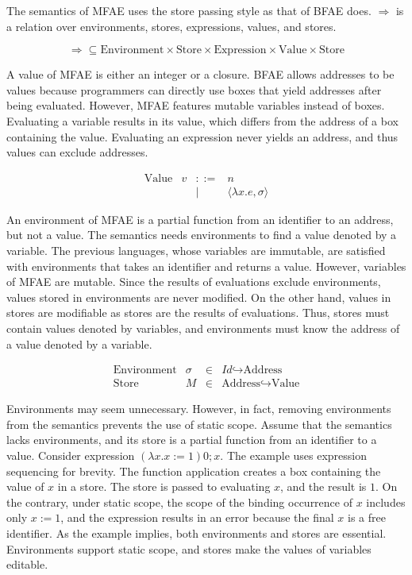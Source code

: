 The semantics of MFAE uses the store passing style as that of BFAE does. \(\Rightarrow\) is a relation over environments, stores, expressions, values, and stores.

\[\Rightarrow\subseteq\text{Environment}\times\text{Store}\times\text{Expression}\times\text{Value}\times\text{Store}\]

A value of MFAE is either an integer or a closure. BFAE allows addresses to be values because programmers can directly use boxes that yield addresses after being evaluated. However, MFAE features mutable variables instead of boxes. Evaluating a variable results in its value, which differs from the address of a box containing the value. Evaluating an expression never yields an address, and thus values can exclude addresses.

\[
\begin{array}{lrcl}
\text{Value} & v & ::= & n \\
&& | & \langle \lambda x.e,\sigma \rangle
\end{array}
\]

An environment of MFAE is a partial function from an identifier to an address, but not a value. The semantics needs environments to find a value denoted by a variable. The previous languages, whose variables are immutable, are satisfied with environments that takes an identifier and returns a value. However, variables of MFAE are mutable. Since the results of evaluations exclude environments, values stored in environments are never modified. On the other hand, values in stores are modifiable as stores are the results of evaluations. Thus, stores must contain values denoted by variables, and environments must know the address of a value denoted by a variable.

\[
\begin{array}{lrcl}
\text{Environment} & \sigma & \in & \textit{Id}\hookrightarrow\text{Address} \\
\text{Store} & M & \in & \text{Address}\hookrightarrow\text{Value}
\end{array}
\]

Environments may seem unnecessary. However, in fact, removing environments from the semantics prevents the use of static scope. Assume that the semantics lacks environments, and its store is a partial function from an identifier to a value. Consider expression \((\lambda x.x:=1)0;x\). The example uses expression sequencing for brevity. The function application creates a box containing the value of \(x\) in a store. The store is passed to evaluating \(x\), and the result is \(1\). On the contrary, under static scope, the scope of the binding occurrence of \(x\) includes only \(x:=1\), and the expression results in an error because the final \(x\) is a free identifier. As the example implies, both environments and stores are essential. Environments support static scope, and stores make the values of variables editable.

